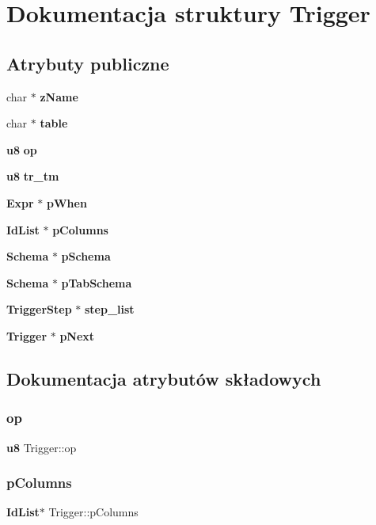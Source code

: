 \section{Dokumentacja struktury Trigger}
\label{struct_trigger}
\subsection*{Atrybuty publiczne}
\begin{DoxyCompactItemize}
\item 
char $\ast$ \textbf{ z\+Name}
\item 
char $\ast$ \textbf{ table}
\item 
\textbf{ u8} \textbf{ op}
\item 
\textbf{ u8} \textbf{ tr\+\_\+tm}
\item 
\textbf{ Expr} $\ast$ \textbf{ p\+When}
\item 
\textbf{ Id\+List} $\ast$ \textbf{ p\+Columns}
\item 
\textbf{ Schema} $\ast$ \textbf{ p\+Schema}
\item 
\textbf{ Schema} $\ast$ \textbf{ p\+Tab\+Schema}
\item 
\textbf{ Trigger\+Step} $\ast$ \textbf{ step\+\_\+list}
\item 
\textbf{ Trigger} $\ast$ \textbf{ p\+Next}
\end{DoxyCompactItemize}


\subsection{Dokumentacja atrybutów składowych}
\mbox{\label{struct_trigger_a855d6b6a302d8d80e1d30ddd70fd403e}} 
\subsubsection{op}
{\footnotesize\ttfamily \textbf{ u8} Trigger\+::op}

\mbox{\label{struct_trigger_a8505fbdf63ca9eadf4b2585e99faa4e4}} 
\subsubsection{pColumns}
{\footnotesize\ttfamily \textbf{ Id\+List}$\ast$ Trigger\+::p\+Columns}

\mbox{\label{struct_trigger_ac28107e1c45789e0146fe45867b8dfdb}} 
